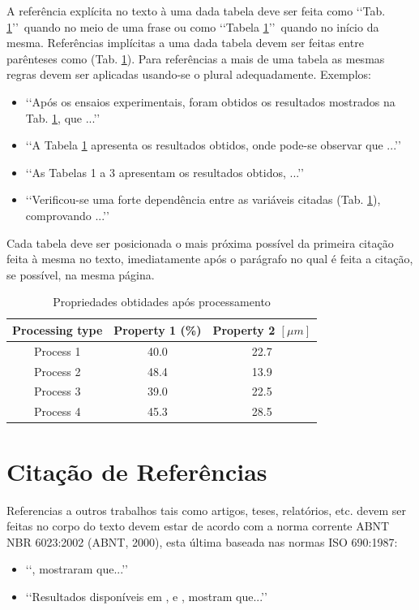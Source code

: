 A referência explícita no texto à uma dada tabela deve ser feita como 
\lq\lq Tab. \ref{tab03}\rq\rq\ quando no meio de uma frase ou como 
\lq\lq Tabela \ref{tab03}\rq\rq\ quando no início da mesma. Referências 
implícitas a uma dada tabela devem ser feitas entre parênteses como 
(Tab. \ref{tab03}). Para referências a mais de uma tabela as mesmas 
regras devem ser aplicadas usando-se o plural adequadamente. Exemplos:
\begin{itemize}
	\item \lq\lq Após os ensaios experimentais, foram obtidos os resultados 
	mostrados na Tab. \ref{tab03}, que ...\rq\rq
	\item \lq\lq A Tabela \ref{tab03} apresenta os resultados obtidos, onde 
	pode-se observar que ...\rq\rq
	\item \lq\lq As Tabelas 1 a 3 apresentam os resultados obtidos, ...\rq\rq
	\item \lq\lq Verificou-se uma forte dependência entre as variáveis citadas 
	(Tab. \ref{tab03}), comprovando ...\rq\rq
\end{itemize}

Cada tabela deve ser posicionada o mais próxima possível da primeira citação 
feita à mesma no texto, imediatamente após o parágrafo no qual é feita a 
citação, se possível, na mesma página.

\begin{table}[h]
	\centering
	\caption{Propriedades obtidades após processamento}
	\label{tab03}
	
	\begin{tabular}{ccc}
		\toprule
		\textbf{Processing type} & \textbf{Property 1} (\%) & 
		\textbf{Property 2} $[\mu m]$ \\
		\midrule
		Process 1 & 40.0 & 22.7 \\
		Process 2 & 48.4 & 13.9 \\
		Process 3 & 39.0 & 22.5 \\
		Process 4 & 45.3 & 28.5 \\
		\bottomrule
	\end{tabular}
\end{table}

\section{Citação de Referências}

Referencias a outros trabalhos tais como artigos, teses, relatórios, etc. devem 
ser feitas no corpo do texto devem estar de acordo com a norma corrente ABNT 
NBR 6023:2002 (ABNT, 2000), esta última baseada nas normas ISO 690:1987:
\begin{itemize}
	\item \lq\lq , mostraram que...\rq\rq

	\item \lq\lq Resultados disponíveis em , 
	e , mostram que...\rq\rq
\end{itemize}

